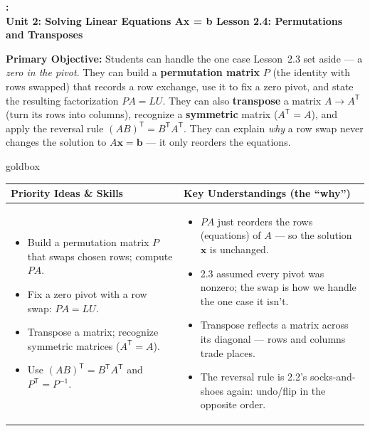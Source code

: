\documentclass[10pt]{article}
\newcommand{\xx}{\mathbf{x}}
\newcommand{\bb}{\mathbf{b}}
\newcommand{\PP}{P}
\newcommand{\tp}{\mathsf{T}}
\newcommand{\UnitNumberName}{Unit 2: Solving Linear Equations Ax = b \quad}
\newcommand{\LessonNumberName}{Lesson 2.4: Permutations and Transposes}
\begin{document}
\begin{center}
    {\Large\bfseries \CourseName: \SchoolYear \\
    {\small\bfseries \UnitNumberName \LessonNumberName}}
\end{center}

\begin{tcolorbox}[colback=blush, colframe=burgundy, boxrule=0.9pt, arc=2mm,
    left=2mm, right=2mm, top=1.5mm, bottom=1.5mm]
    \textbf{Primary Objective:} Students can handle the one case Lesson~2.3 set aside --- a
    \emph{zero in the pivot}. They can build a \textbf{permutation matrix} $\PP$ (the identity with rows
    swapped) that records a row exchange, use it to fix a zero pivot, and state the resulting
    factorization $\PP A=LU$. They can also \textbf{transpose} a matrix $A\to A^{\tp}$ (turn its rows into
    columns), recognize a \textbf{symmetric} matrix ($A^{\tp}=A$), and apply the reversal rule
    $(AB)^{\tp}=B^{\tp}A^{\tp}$. They can explain \emph{why} a row swap never changes the solution to
    $A\xx=\bb$ --- it only reorders the equations.
\end{tcolorbox}

\renewcommand{\arraystretch}{1.4}
\begin{skillbox}{goldbox}
\begin{tabularx}{\linewidth}{@{}X|X@{}}
\textbf{Priority Ideas \& Skills} & \textbf{Key Understandings (the ``why'')} \\[2pt]
\hline
\vspace{-6pt}
\begin{itemize}[leftmargin=1.1em, nosep, after=\vspace{2pt}]
  \item Build a permutation matrix $\PP$ that swaps chosen rows; compute $\PP A$.
  \item Fix a zero pivot with a row swap: $\PP A=LU$.
  \item Transpose a matrix; recognize symmetric matrices ($A^{\tp}=A$).
  \item Use $(AB)^{\tp}=B^{\tp}A^{\tp}$ and $\PP^{\tp}=\PP^{-1}$.
\end{itemize}
&
\vspace{-6pt}
\begin{itemize}[leftmargin=1.1em, nosep, after=\vspace{2pt}]
  \item $\PP A$ just reorders the rows (equations) of $A$ --- so the solution $\xx$ is unchanged.
  \item 2.3 assumed every pivot was nonzero; the swap is how we handle the one case it isn't.
  \item Transpose reflects a matrix across its diagonal --- rows and columns trade places.
  \item The reversal rule is 2.2's socks-and-shoes again: undo/flip in the opposite order.
\end{itemize}
\end{tabularx}
\end{skillbox}
\end{document}
